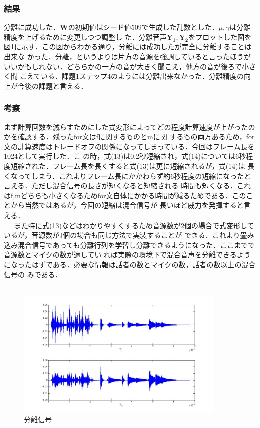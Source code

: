 \documentclass[a4j]{jarticle}
\begin{document}
\subsubsection{結果}
分離に成功した．$\bm{W}$の初期値はシード値509で生成した乱数とした．$\mu, \gamma$は分離精度を上げるために変更しつつ調整し
た．分離音声$\bm{Y_1}, \bm{Y_2}$をプロットした図を図\ref{picbunri}に示す．この図からわかる通り，分離には成功したが完全に分離することは出来な
かった．分離，というよりは片方の音源を強調していると言ったほうがいいかもしれない．どちらかの一方の音が大きく聞こえ，他方の音が後ろで小さく聞
こえている．課題1ステップ4のようには分離出来なかった．分離精度の向上が今後の課題と言える．

\subsubsection{考察}
まず計算回数を減らすためにした式変形によってどの程度計算速度が上がったのかを確認する．残ったfor文はfに関するものとmに関
するもの両方あるため，for文の計算速度はトレードオフの関係になってしまっている．今回はフレーム長を1024として実行した．こ
の時，式(13)は0.2秒短縮され，式(14)については6秒程度短縮された．フレーム長を長くすると式(13)は更に短縮されるが，式(14)は
長くなってしまう．これよりフレーム長にかかわらず約6秒程度の短縮になったと言える．ただし混合信号の長さが短くなると短縮される
時間も短くなる．これはf,mどちらも小さくなるためfor文自体にかかる時間が減るためである．このことから当然ではあるが，今回の短縮は混合信号が
長いほど威力を発揮すると言える．\\\ \ \
また特に式(13)などはわかりやすくするため音源数が2個の場合で式変形しているが，音源数がJ個の場合も同じ方法で実装することが
できる．これより畳み込み混合信号であっても分離行列を学習し分離できるようになった．ここまでで音源数とマイクの数が適してい
れば実際の環境下で混合音声を分離できるようになったはずである．必要な情報は話者の数とマイクの数，話者の数以上の混合信号の
みである．\\\ \ \ 

\begin{figure}[htb]
 \begin{center}
  \includegraphics[width=10cm, clip, bb=0 0 892 550]{pic/samplebunri.jpg}
  \caption{分離信号}
  \label{picbunri}
 \end{center}
\end{figure}
\end{document}
